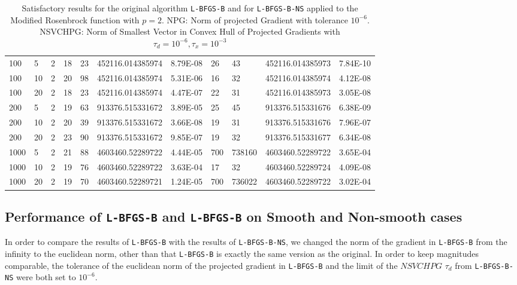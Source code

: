 \begin{center}
\begin{table}
\begin{center}
\begin{tabular}{|l|l|l|l|l|l|l|l|l|l|l|}
        100 & 5 & 2 & 18 & 23 & 452116.014385974 & 8.79E-08 & 26 & 43 & 452116.014385973 & 7.84E-10\\
        100 & 10 & 2 & 20 & 98 & 452116.014385974 & 5.31E-06 & 16 & 32 & 452116.014385974 & 4.12E-08\\
        100 & 20 & 2 & 18 & 23 & 452116.014385974 & 4.47E-07 & 22 & 31 & 452116.014385973 & 3.05E-08\\
        200 & 5 & 2 & 19 & 63 & 913376.515331672 & 3.89E-05 & 25 & 45 & 913376.515331676 & 6.38E-09\\
        200 & 10 & 2 & 20 & 39 & 913376.515331672 & 3.66E-08 & 19 & 31 & 913376.515331676 & 7.96E-07\\
        200 & 20 & 2 & 23 & 90 & 913376.515331672 & 9.85E-07 & 19 & 32 & 913376.515331677 & 6.34E-08\\
        1000 & 5 & 2 & 21 & 88 & 4603460.52289722 & 4.44E-05 & 700 & 738160 & 4603460.52289722 & 3.65E-04\\
        1000 & 10 & 2 & 19 & 76 & 4603460.52289722 & 3.63E-04 & 17 & 32 & 4603460.52289724 & 4.09E-08\\
        1000 & 20 & 2 & 19 & 70 & 4603460.52289721 & 1.24E-05 & 700 & 736022 & 4603460.52289722 & 3.02E-04\\
        \hline
      \end{tabular}
      \caption[Modified Rosenbrock with $p = 2$]{Satisfactory results for the original algorithm \texttt{L-BFGS-B}  and for \texttt{L-BFGS-B-NS} applied to the Modified Rosenbrock function with $p = 2$. NPG: Norm of projected Gradient with tolerance $10^{-6}$. 
NSVCHPG: Norm of Smallest Vector in Convex Hull of Projected Gradients with $\tau_d = 10^{-6}, \tau_x = 10^{-3}$}
      \label{pequal2}
    \end{center}
  \end{table}
\end{center}

\subsection{Performance of \texttt{L-BFGS-B} and  \texttt{L-BFGS-B} on Smooth and Non-smooth cases}

In order to compare the results of \texttt{L-BFGS-B} with the results of \texttt{L-BFGS-B-NS}, we changed the norm of the gradient in \texttt{L-BFGS-B} from the infinity to the euclidean norm, other than that \texttt{L-BFGS-B} is exactly the same version as the original. In order to keep magnitudes comparable, the tolerance of the euclidean norm of the projected gradient in \texttt{L-BFGS-B} and the limit of the $NSVCHPG$ $\tau_d$ from \texttt{L-BFGS-B-NS} were both set to $10^{-6}$.

